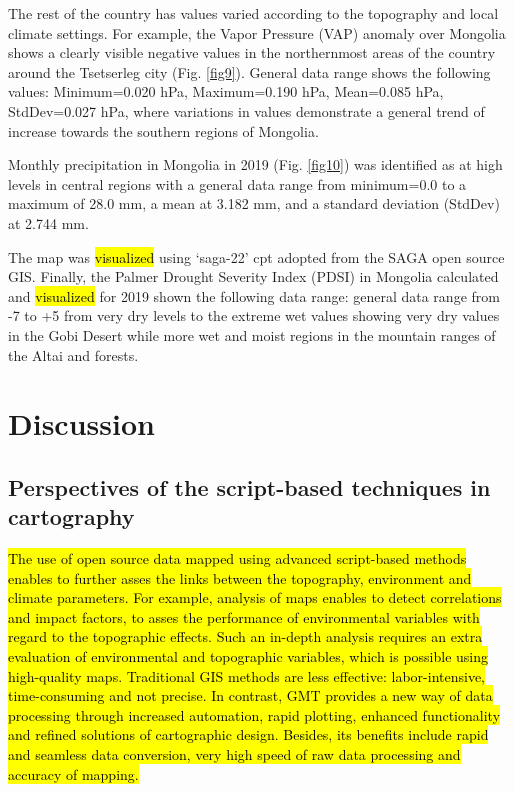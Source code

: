 \documentclass[geosciences,article,submit,pdftex,moreauthors]{Definitions/mdpi}
\begin{document}
The rest of the country has values varied according to the topography and local climate settings. For example, the Vapor Pressure (VAP) anomaly over Mongolia shows a clearly visible negative values in the northernmost areas of the country around the Tsetserleg city (Fig. \ref{fig9}). General data range shows the following values: Minimum=0.020 hPa, Maximum=0.190 hPa, Mean=0.085 hPa, StdDev=0.027 hPa, where variations in values demonstrate a general trend of increase towards the southern regions of Mongolia. 

Monthly precipitation in Mongolia in 2019 (Fig. \ref{fig10}) was identified as at high levels in central regions with a general data range from minimum=0.0 to a maximum of 28.0 mm, a mean at 3.182 mm, and a standard deviation (StdDev) at 2.744 mm. 

The map was \hl{visualized} using ‘saga-22’ cpt adopted from the SAGA open source GIS. Finally, the Palmer Drought Severity Index (PDSI) in Mongolia calculated and \hl{visualized} for 2019 shown the following data range: general data range from -7 to +5 from very dry levels to the extreme wet values showing very dry values in the Gobi Desert while more wet and moist regions in the mountain ranges of the Altai and forests. 

\section{Discussion}
\subsection{Perspectives of the script-based techniques in cartography}

\hl{The use of open source data mapped using advanced script-based methods enables to further asses the links between the topography, environment and climate parameters. For example, analysis of maps enables to detect correlations and impact factors, to asses the performance of environmental variables with regard to the topographic effects. Such an in-depth analysis requires an extra evaluation of environmental and topographic variables, which is possible using high-quality maps. Traditional GIS methods are less effective: labor-intensive, time-consuming and not precise. In contrast, GMT provides a new way of data processing through increased automation, rapid plotting, enhanced functionality and refined solutions of cartographic design. Besides, its benefits include rapid and seamless data conversion, very high speed of raw data processing and accuracy of mapping.} 
\end{document}

